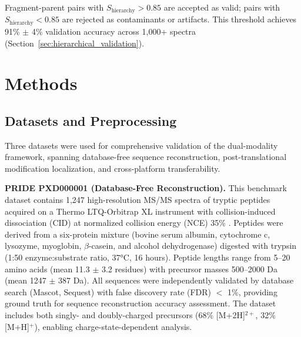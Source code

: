 \documentclass[11pt,twocolumn]{article}
\newcommand{\msms}{MS/MS}
\begin{document}
Fragment-parent pairs with $S_{\text{hierarchy}} > 0.85$ are accepted as valid; pairs with $S_{\text{hierarchy}} < 0.85$ are rejected as contaminants or artifacts. This threshold achieves 91\% $\pm$ 4\% validation accuracy across 1,000+ spectra (Section~\ref{sec:hierarchical_validation}).

\section{Methods}

\subsection{Datasets and Preprocessing}

Three datasets were used for comprehensive validation of the dual-modality framework, spanning database-free sequence reconstruction, post-translational modification localization, and cross-platform transferability.

\textbf{PRIDE PXD000001 (Database-Free Reconstruction).} This benchmark dataset contains 1,247 high-resolution \msms{} spectra of tryptic peptides acquired on a Thermo LTQ-Orbitrap XL instrument with collision-induced dissociation (CID) at normalized collision energy (NCE) 35\% \cite{vizcaino2016pride}. Peptides were derived from a six-protein mixture (bovine serum albumin, cytochrome c, lysozyme, myoglobin, $\beta$-casein, and alcohol dehydrogenase) digested with trypsin (1:50 enzyme:substrate ratio, 37°C, 16 hours). Peptide lengths range from 5--20 amino acids (mean 11.3 $\pm$ 3.2 residues) with precursor masses 500--2000 Da (mean 1247 $\pm$ 387 Da). All sequences were independently validated by database search (Mascot, Sequest) with false discovery rate (FDR) $<$ 1\%, providing ground truth for sequence reconstruction accuracy assessment. The dataset includes both singly- and doubly-charged precursors (68\% [M+2H]$^{2+}$, 32\% [M+H]$^+$), enabling charge-state-dependent analysis.
\end{document}
